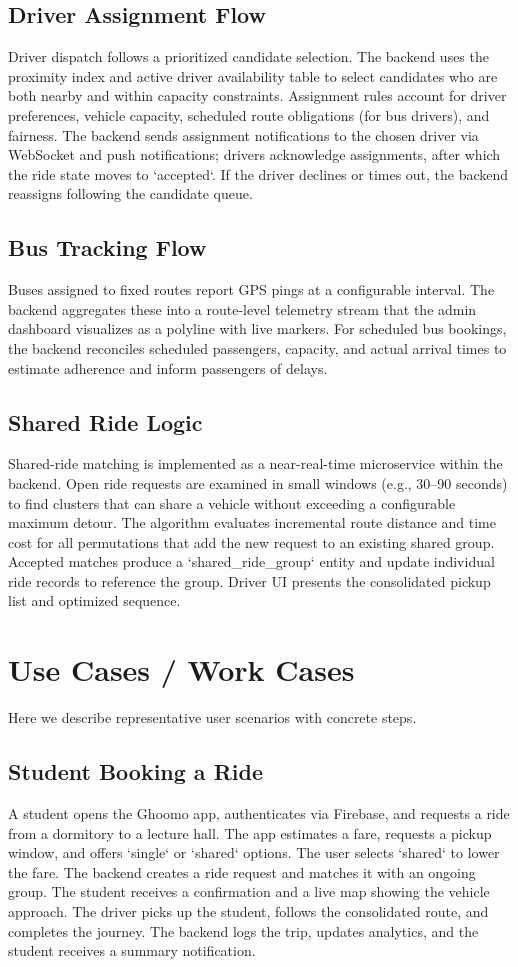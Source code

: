 \documentclass[12pt,a4paper]{article}
\begin{document}
\subsection{Driver Assignment Flow}
Driver dispatch follows a prioritized candidate selection. The backend uses the proximity index and active driver availability table to select candidates who are both nearby and within capacity constraints. Assignment rules account for driver preferences, vehicle capacity, scheduled route obligations (for bus drivers), and fairness. The backend sends assignment notifications to the chosen driver via WebSocket and push notifications; drivers acknowledge assignments, after which the ride state moves to `accepted`. If the driver declines or times out, the backend reassigns following the candidate queue.

\subsection{Bus Tracking Flow}
Buses assigned to fixed routes report GPS pings at a configurable interval. The backend aggregates these into a route-level telemetry stream that the admin dashboard visualizes as a polyline with live markers. For scheduled bus bookings, the backend reconciles scheduled passengers, capacity, and actual arrival times to estimate adherence and inform passengers of delays.

\subsection{Shared Ride Logic}
Shared-ride matching is implemented as a near-real-time microservice within the backend. Open ride requests are examined in small windows (e.g., 30--90 seconds) to find clusters that can share a vehicle without exceeding a configurable maximum detour. The algorithm evaluates incremental route distance and time cost for all permutations that add the new request to an existing shared group. Accepted matches produce a `shared_ride_group` entity and update individual ride records to reference the group. Driver UI presents the consolidated pickup list and optimized sequence.

\section{Use Cases / Work Cases}
Here we describe representative user scenarios with concrete steps.

\subsection{Student Booking a Ride}
A student opens the Ghoomo app, authenticates via Firebase, and requests a ride from a dormitory to a lecture hall. The app estimates a fare, requests a pickup window, and offers `single` or `shared` options. The user selects `shared` to lower the fare. The backend creates a ride request and matches it with an ongoing group. The student receives a confirmation and a live map showing the vehicle approach. The driver picks up the student, follows the consolidated route, and completes the journey. The backend logs the trip, updates analytics, and the student receives a summary notification.
\end{document}
